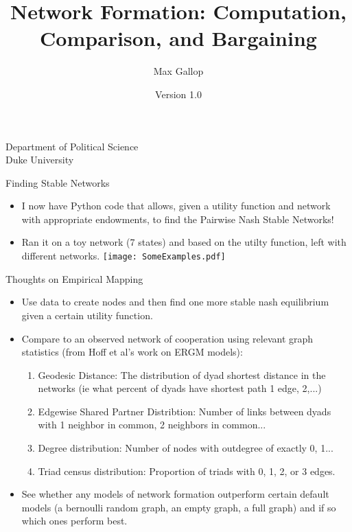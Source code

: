 \documentclass{beamer}
\begin{document}
\lstset{
basicstyle=\ttfamily,
keywordstyle=\bfseries,
showstringspaces=false,
columns = fullflexible,
mathescape = false,
language=R
}


\title[Gallop Network Formation]
{Network Formation: Computation, Comparison, and Bargaining}
\author[M. Gallop]
{Max Gallop} 
\institute
{		Department of Political Science\\
		Duke University\\
		
		}

\date{Version 1.0}

\begin{frame}
\titlepage
\end{frame}


\begin{frame}{Finding Stable Networks}
\begin{itemize}
\item I now have Python code that allows, given a utility function and network with appropriate endowments, to find the Pairwise Nash Stable Networks!
\item Ran it on a toy network (7 states) and based on the utilty function, left with different networks.
\texttt{[image: SomeExamples.pdf]}
\end{itemize}
\end{frame}

\begin{frame}{Thoughts on Empirical Mapping}
\begin{itemize}
\item Use data to create nodes and then find one more stable nash equilibrium given a certain utility function.
\item Compare to an observed network of cooperation using relevant graph statistics (from Hoff et al's work on ERGM models):
\begin{enumerate}
\item Geodesic Distance: The distribution of dyad shortest distance in the networks (ie what percent of dyads have shortest path 1 edge, 2,...)
\item Edgewise Shared Partner Distribtion: Number of links between dyads with 1 neighbor in common, 2 neighbors in common...
\item Degree distribution: Number of nodes with outdegree of exactly 0, 1...
\item Triad census distribution: Proportion of triads with 0, 1, 2,  or 3 edges.
\end{enumerate}
\item See whether any models of network formation outperform certain default models (a bernoulli random graph, an empty graph, a full graph) and if so which ones perform best.
\end{itemize}
\end{frame}
\end{document}
